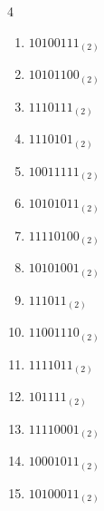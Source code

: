 \begin{multicols}{4}
\begin{enumerate}
        \phantom{$=188$}

  \item $10100111_{(2)}$

        \phantom{$=167$}

\columnbreak %

  \item $10101100_{(2)}$

        \phantom{$=172$}

  \item $1110111_{(2)}$

        \phantom{$=119$}

  \item $1110101_{(2)}$

        \phantom{$=117$}

  \item $10011111_{(2)}$

        \phantom{$=159$}

  \item $10101011_{(2)}$

        \phantom{$=171$}

  \item $11110100_{(2)}$

        \phantom{$=244$}

  \item $10101001_{(2)}$

        \phantom{$=169$}

  \item $111011_{(2)}$

        \phantom{$=59$}

  \item $11001110_{(2)}$

        \phantom{$=206$}

  \item $1111011_{(2)}$

        \phantom{$=123$}

  \item $101111_{(2)}$

        \phantom{$=47$}

  \item $11110001_{(2)}$

        \phantom{$=241$}

  \item $10001011_{(2)}$

        \phantom{$=139$}

  \item $10100011_{(2)}$


\end{enumerate}
\end{multicols}
